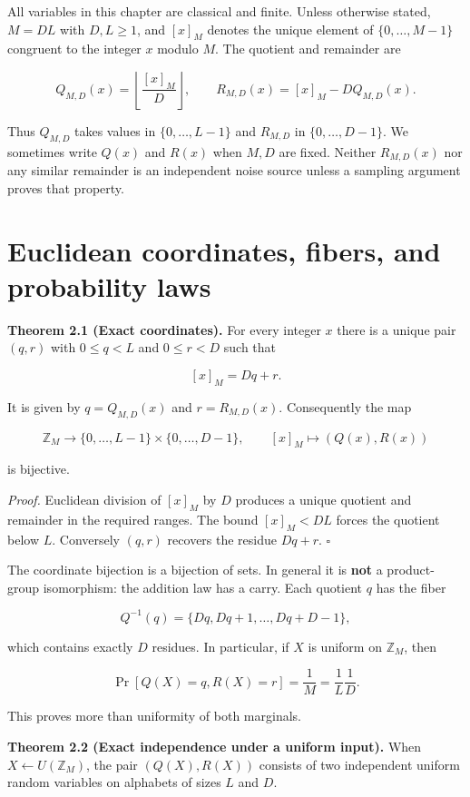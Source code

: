 \documentclass[
  11pt,
  a4paper,
  oneside]{report}
\begin{document}
All variables in this chapter are classical and finite. Unless otherwise
stated, \(M=DL\) with \(D,L\ge 1\), and \([x]_M\) denotes the unique
element of \(\{0,\ldots,M-1\}\) congruent to the integer \(x\) modulo
\(M\). The quotient and remainder are

\[
Q_{M,D}(x)=\left\lfloor\frac{[x]_M}{D}\right\rfloor,
\qquad R_{M,D}(x)=[x]_M-DQ_{M,D}(x).
\]

Thus \(Q_{M,D}\) takes values in \(\{0,\ldots,L-1\}\) and \(R_{M,D}\) in
\(\{0,\ldots,D-1\}\). We sometimes write \(Q(x)\) and \(R(x)\) when
\(M,D\) are fixed. Neither \(R_{M,D}(x)\) nor any similar remainder is
an independent noise source unless a sampling argument proves that
property.

\section{Euclidean coordinates, fibers, and probability
laws}\label{euclidean-coordinates-fibers-and-probability-laws}

\textbf{Theorem 2.1 (Exact coordinates).} For every integer \(x\) there
is a unique pair \((q,r)\) with \(0\le q<L\) and \(0\le r<D\) such that

\[
[x]_M=Dq+r.
\]

It is given by \(q=Q_{M,D}(x)\) and \(r=R_{M,D}(x)\). Consequently the
map

\[
\mathbb Z_M\longrightarrow \{0,\ldots,L-1\}\times\{0,\ldots,D-1\},
\qquad [x]_M\mapsto (Q(x),R(x))
\]

is bijective.

\emph{Proof.} Euclidean division of \([x]_M\) by \(D\) produces a unique
quotient and remainder in the required ranges. The bound \([x]_M<DL\)
forces the quotient below \(L\). Conversely \((q,r)\) recovers the
residue \(Dq+r\). \(\square\)

The coordinate bijection is a bijection of sets. In general it is
\textbf{not} a product-group isomorphism: the addition law has a carry.
Each quotient \(q\) has the fiber

\[
Q^{-1}(q)=\{Dq,Dq+1,\ldots,Dq+D-1\},
\]

which contains exactly \(D\) residues. In particular, if \(X\) is
uniform on \(\mathbb Z_M\), then

\[
\Pr[Q(X)=q,R(X)=r]=\frac1M=\frac1L\frac1D.
\]

This proves more than uniformity of both marginals.

\textbf{Theorem 2.2 (Exact independence under a uniform input).} When
\(X\leftarrow U(\mathbb Z_M)\), the pair \((Q(X),R(X))\) consists of two
independent uniform random variables on alphabets of sizes \(L\) and
\(D\).
\end{document}
